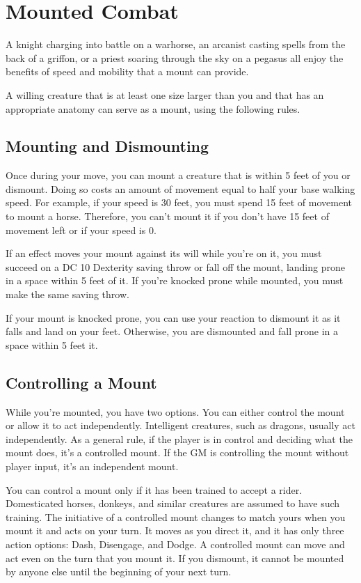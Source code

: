 \section{Mounted Combat}

A knight charging into battle on a warhorse, an arcanist casting spells from the back of a griffon, or a priest soaring through the sky on a pegasus all enjoy the benefits of speed and mobility that a mount can provide.

A willing creature that is at least one size larger than you and that has an appropriate anatomy can serve as a mount, using the following rules.

\subsection{Mounting and Dismounting}

Once during your move, you can mount a creature that is within 5 feet of you or dismount. Doing so costs an amount of movement equal to half your base walking speed. For example, if your speed is 30 feet, you must spend 15 feet of movement to mount a horse. Therefore, you can't mount it if you don't have 15 feet of movement left or if your speed is 0.

If an effect moves your mount against its will while you're on it, you must succeed on a DC 10 Dexterity saving throw or fall off the mount, landing prone in a space within 5 feet of it. If you're knocked prone while mounted, you must make the same saving throw.

If your mount is knocked prone, you can use your reaction to dismount it as it falls and land on your feet. Otherwise, you are dismounted and fall prone in a space within 5 feet it.

\subsection{Controlling a Mount}

While you're mounted, you have two options. You can either control the mount or allow it to act independently. Intelligent creatures, such as dragons, usually act independently. As a general rule, if the player is in control and deciding what the mount does, it's a controlled mount. If the GM is controlling the mount without player input, it's an independent mount.

You can control a mount only if it has been trained to accept a rider. Domesticated horses, donkeys, and similar creatures are assumed to have such training. The initiative of a controlled mount changes to match yours when you mount it and acts on your turn. It moves as you direct it, and it has only three action options: Dash, Disengage, and Dodge. A controlled mount can move and act even on the turn that you mount it. If you dismount, it cannot be mounted by anyone else until the beginning of your next turn.

